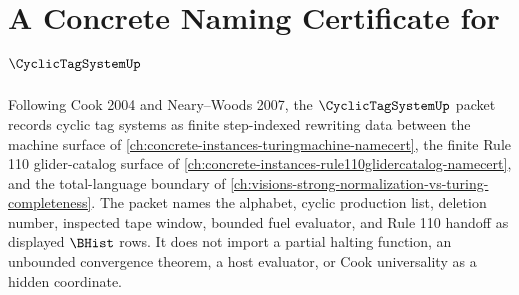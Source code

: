 \chapter{A Concrete Naming Certificate for $\CyclicTagSystemUp$}
\label{ch:concrete-instances-cyclic-tag-system-namecert}

Following Cook 2004 and Neary--Woods 2007, the $\CyclicTagSystemUp$ packet records cyclic tag systems as finite step-indexed rewriting data between the machine surface of \autoref{ch:concrete-instances-turingmachine-namecert}, the finite Rule 110 glider-catalog surface of \autoref{ch:concrete-instances-rule110glidercatalog-namecert}, and the total-language boundary of \autoref{ch:visions-strong-normalization-vs-turing-completeness}. The packet names the alphabet, cyclic production list, deletion number, inspected tape window, bounded fuel evaluator, and Rule 110 handoff as displayed $\BHist$ rows. It does not import a partial halting function, an unbounded convergence theorem, a host evaluator, or Cook universality as a hidden coordinate.

